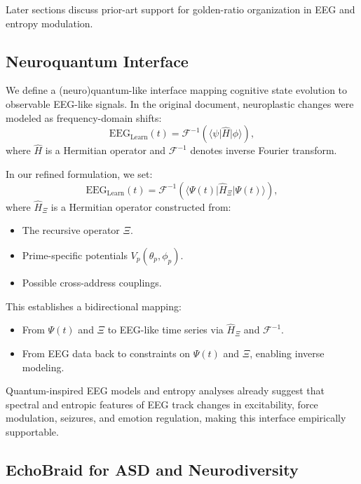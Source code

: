 \documentclass[11pt]{article}
\begin{document}
Later sections discuss prior-art support for golden-ratio organization in EEG and entropy modulation. \cite{GoldenEEG,EEGEntropyForce,EEGEntropyBiomarker}

\subsection{Neuroquantum Interface}

We define a (neuro)quantum-like interface mapping cognitive state evolution to observable EEG-like signals. In the original document, neuroplastic changes were modeled as frequency-domain shifts:
\[
\mathrm{EEG}_{\mathrm{Learn}}(t) = \mathcal{F}^{-1}(\langle \psi \vert \hat{H} \vert \phi \rangle),
\]
where $\hat{H}$ is a Hermitian operator and $\mathcal{F}^{-1}$ denotes inverse Fourier transform. \cite{neuroplasticityMT}

In our refined formulation, we set:
\begin{equation}
\mathrm{EEG}_{\mathrm{Learn}}(t) = \mathcal{F}^{-1}\left(\big\langle \Psi(t) \big| \hat{H}_\Xi \big| \Psi(t) \big\rangle\right),
\end{equation}
where $\hat{H}_\Xi$ is a Hermitian operator constructed from:

\begin{itemize}[noitemsep]
  \item The recursive operator $\Xi$.
  \item Prime-specific potentials $V_p(\theta_p, \phi_p)$.
  \item Possible cross-address couplings.
\end{itemize}

This establishes a bidirectional mapping:

\begin{itemize}[noitemsep]
  \item From $\Psi(t)$ and $\Xi$ to EEG-like time series via $\hat{H}_\Xi$ and $\mathcal{F}^{-1}$.
  \item From EEG data back to constraints on $\Psi(t)$ and $\Xi$, enabling inverse modeling.
\end{itemize}

Quantum-inspired EEG models and entropy analyses already suggest that spectral and entropic features of EEG track changes in excitability, force modulation, seizures, and emotion regulation, making this interface empirically supportable. \cite{QuantumEEG1,QuantumEEG2,EEGEntropyForce,EEGEntropySeizure,EEGEntropyBiomarker,EEGEntropyEmotion}

\subsection{EchoBraid for ASD and Neurodiversity}
\end{document}
